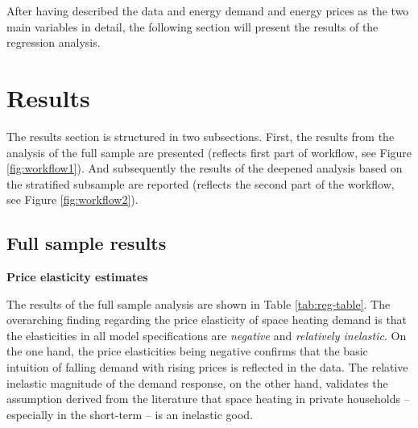 \documentclass[12pt,twoside]{reedthesis}
\begin{document}
After having described the data and energy demand and energy prices as the two main variables in detail, the following section will present the results of the regression analysis.

\hypertarget{results}{%
\chapter{Results}\label{results}}

The results section is structured in two subsections. First, the results from the analysis of the full sample are presented (reflects first part of workflow, see Figure \ref{fig:workflow1}). And subsequently the results of the deepened analysis based on the stratified subsample are reported (reflects the second part of the workflow, see Figure \ref{fig:workflow2}).

\hypertarget{full_sample_results}{%
\section{Full sample results}\label{full_sample_results}}

\textbf{Price elasticity estimates}

The results of the full sample analysis are shown in Table \ref{tab:reg-table}. The overarching finding regarding the price elasticity of space heating demand is that the elasticities in all model specifications are \emph{negative} and \emph{relatively inelastic}. On the one hand, the price elasticities being negative confirms that the basic intuition of falling demand with rising prices is reflected in the data. The relative inelastic magnitude of the demand response, on the other hand, validates the assumption derived from the literature that space heating in private households -- especially in the short-term -- is an inelastic good.
\end{document}
